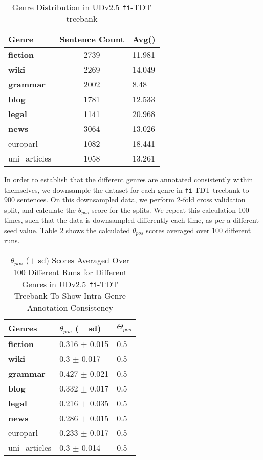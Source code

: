 \begin{table}[H]
    \centering
    \begin{tabular}{|l|c|l|}
        \hline
        \textbf{Genre} & \textbf{Sentence Count} & \textbf{Avg()}\\
        \hline
        \hline
        \textbf{fiction} & 2739 & 11.981\\
        \textbf{wiki} & 2269 & 14.049\\
        \textbf{grammar} & 2002 & 8.48\\
        \textbf{blog} & 1781 & 12.533\\
        \textbf{legal} & 1141 & 20.968\\
        \textbf{news} & 3064 & 13.026\\ 
        europarl & 1082 & 18.441\\
        uni\_articles & 1058 & 13.261\\
        \hline
    \end{tabular}
    \caption{Genre Distribution in UDv2.5 \texttt{fi}-TDT treebank}
    \label{tab:genre_fi}
\end{table}

In order to establish that the different genres are annotated consistently within themselves, we downsample the dataset for each genre in \texttt{fi}-TDT treebank to 900 sentences. On this downsampled data, we perform 2-fold cross validation split, and calculate the $\theta_{pos}$ score for the splits. We repeat this calculation 100 times, such that the data is downsampled differently each time, as per a different seed value. Table \ref{tab:genre_all_kfold} shows the calculated $\theta_{pos}$ scores averaged over 100 different runs.

\begin{table}[H]
    \centering
    \begin{tabular}{|l|l|l|}
        \hline
        \textbf{Genres} & \textbf{$\theta_{pos}$} ($\pm$ sd) & $\Theta_{pos}$\\
        \hline
        \textbf{fiction} & 0.316 $\pm$ 0.015 & 0.5\\
        \textbf{wiki} & 0.3 $\pm$ 0.017 & 0.5\\
        \textbf{grammar} & 0.427 $\pm$ 0.021 & 0.5\\
        \textbf{blog} & 0.332 $\pm$ 0.017 & 0.5\\
        \textbf{legal} & 0.216 $\pm$ 0.035 & 0.5\\
        \textbf{news} & 0.286 $\pm$ 0.015 & 0.5\\
        europarl & 0.233 $\pm$ 0.017 & 0.5\\
        uni\_articles & 0.3 $\pm$ 0.014 & 0.5\\
        \hline
    \end{tabular}
    \caption{$\theta_{pos}$ ($\pm$ sd) Scores Averaged Over 100 Different Runs for Different Genres in UDv2.5 \texttt{fi}-TDT Treebank To Show Intra-Genre Annotation Consistency}
    \label{tab:genre_all_kfold}
\end{table}

